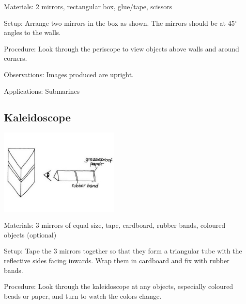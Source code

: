 \begin{multicols}{2}
\begin{description*}
\item[Materials:]{2 mirrors, rectangular box, glue/tape, scissors}
\item[Setup:]{Arrange two mirrors in the box as shown. The mirrors should be at 45$^\circ$ angles to the walls. }
\item[Procedure:]{Look through the periscope to view objects above walls and around corners.}
\item[Observations:]{Images produced are upright.}
\item[Applications:]{Submarines}
\end{description*}

\vfill
\columnbreak

\subsection{Kaleidoscope} 

\begin{center}
\includegraphics[width=0.45\textwidth]{./img/vso/kaleidoscope.jpg}
\end{center}

\begin{description*}
\item[Materials:]{3 mirrors of equal size, tape, cardboard, rubber bands, coloured objects (optional)}
\item[Setup:]{Tape the 3 mirrors together so that they form a triangular tube with the reflective sides facing inwards. Wrap them in cardboard and fix with rubber bands.}
\item[Procedure:]{Look through the kaleidoscope at any objects, especially coloured beads or paper, and turn to watch the colors change.}
\end{description*}


\end{multicols}

\pagebreak